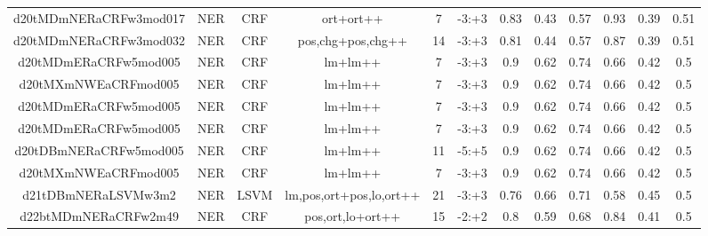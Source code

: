 \documentclass[a4paper]{article}
\begin{document}
\begin{landscape}
\begin{center}
\begin{tabular}{ |c|c|c|c|c|c|c|c|c|c|c|c|}
 
 	
 	\small{ d20tMDmNERaCRFw3mod017 } & \small{ NER} & \small{  CRF }  & ort+ort++  &  7 &  \small{  -3:+3 }  &  0.83 & 0.43 & 0.57  &  0.93 & 0.39 & 0.51 \\
 	

 
 	
 	\small{ d20tMDmNERaCRFw3mod032 } & \small{ NER} & \small{  CRF }  & pos,chg+pos,chg++  &  14 &  \small{  -3:+3 }  &  0.81 & 0.44 & 0.57  &  0.87 & 0.39 & 0.51 \\
 	

 
 	
 	\small{ d20tMDmERaCRFw5mod005 } & \small{ NER} & \small{  CRF }  & lm+lm++  &  7 &  \small{  -3:+3 }  &  0.9 & 0.62 & 0.74  &  0.66 & 0.42 & 0.5 \\
 	

 
 	
 	\small{ d20tMXmNWEaCRFmod005 } & \small{ NER} & \small{  CRF }  & lm+lm++  &  7 &  \small{  -3:+3 }  &  0.9 & 0.62 & 0.74  &  0.66 & 0.42 & 0.5 \\
 	

 
 	
 	\small{ d20tMDmERaCRFw5mod005 } & \small{ NER} & \small{  CRF }  & lm+lm++  &  7 &  \small{  -3:+3 }  &  0.9 & 0.62 & 0.74  &  0.66 & 0.42 & 0.5 \\
 	

 
 	
 	\small{ d20tMDmERaCRFw5mod005 } & \small{ NER} & \small{  CRF }  & lm+lm++  &  7 &  \small{  -3:+3 }  &  0.9 & 0.62 & 0.74  &  0.66 & 0.42 & 0.5 \\
 	

 
 	
 	\small{ d20tDBmNERaCRFw5mod005 } & \small{ NER} & \small{  CRF }  & lm+lm++  &  11 &  \small{  -5:+5 }  &  0.9 & 0.62 & 0.74  &  0.66 & 0.42 & 0.5 \\
 	

 
 	
 	\small{ d20tMXmNWEaCRFmod005 } & \small{ NER} & \small{  CRF }  & lm+lm++  &  7 &  \small{  -3:+3 }  &  0.9 & 0.62 & 0.74  &  0.66 & 0.42 & 0.5 \\
 	

 
 	
 	\small{ d21tDBmNERaLSVMw3m2 } & \small{ NER} & \small{  LSVM }  & lm,pos,ort+pos,lo,ort++  &  21 &  \small{  -3:+3 }  &  0.76 & 0.66 & 0.71  &  0.58 & 0.45 & 0.5 \\
 	

 
 	
 	\small{ d22btMDmNERaCRFw2m49 } & \small{ NER} & \small{  CRF }  & pos,ort,lo+ort++  &  15 &  \small{  -2:+2 }  &  0.8 & 0.59 & 0.68  &  0.84 & 0.41 & 0.5 \\
 	


\end{tabular}
\end{center}
\end{landscape}
\end{document}
